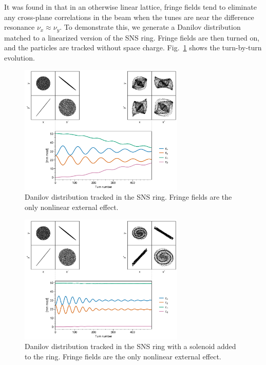 It was found in \cite{Holmes2018} that in an otherwise linear lattice, fringe fields tend to eliminate any cross-plane correlations in the beam when the tunes are near the difference resonance $\nu_x \approx \nu_y$. To demonstrate this, we generate a Danilov distribution matched to a linearized version of the SNS ring. Fringe fields are then turned on, and the particles are tracked without space charge. Fig.~\ref{fig:fringe_a} shows the turn-by-turn evolution.
%
\begin{figure}[!p]
    \centering
    \includegraphics[width=0.7\textwidth]{Images/chapter3/fringe.png}
    \caption{Danilov distribution tracked in the SNS ring. Fringe fields are the only nonlinear external effect.}
    \label{fig:fringe_a}
    \vspace*{3cm}
\end{figure}
%
%
\begin{figure}[!p]
    \centering
    \includegraphics[width=0.7\textwidth]{Images/chapter3/fringe_solenoid.png}
    \caption{Danilov distribution tracked in the SNS ring with a solenoid added to the ring. Fringe fields are the only nonlinear external effect.}
    \label{fig:fringe_b}
    \vspace*{3cm}
\end{figure}
